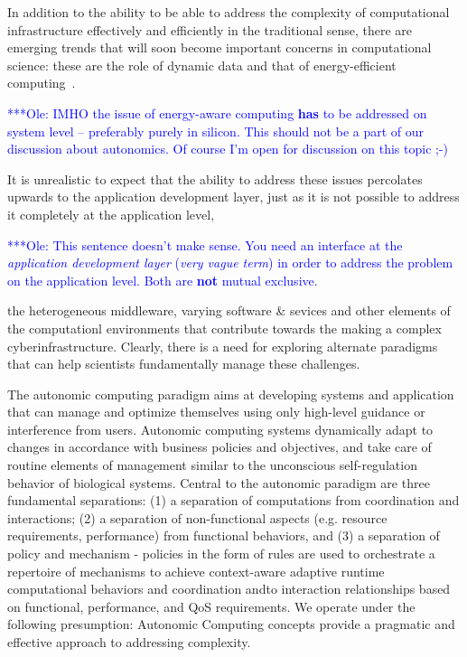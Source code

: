 \documentclass[a4paper,10pt]{article}
\newcommand{\onote}[1]{  {\textcolor{blue}     { ***Ole: #1 }}}
\begin{document}
In addition to the ability to be able to address the complexity of
computational infrastructure effectively and efficiently in the
traditional sense, there are emerging trends that will soon become
important concerns in computational science: these are the role of
dynamic data and that of energy-efficient
computing~\cite{exa-kogge09}. 

\onote {IMHO the issue of energy-aware computing \textbf{has} to 
be addressed on system level -- preferably purely in silicon.
This should not be a part of our discussion about autonomics.
Of course I'm open for discussion on this topic ;-)}

It is unrealistic to expect that the
ability to address these issues percolates upwards to the application
development layer, just as it is not possible to address it completely at
the application level, 

\onote {This sentence doesn't make sense. You need an interface at the
\textit{application development layer} (\textit{very vague term})
in order to address the problem on the application level. Both are 
\textbf{not} mutual exclusive. }

the heterogeneous middleware, varying software
\& sevices and other elements of the computationl environments that
contribute towards the making a complex cyberinfrastructure.  Clearly,
there is a need for exploring alternate paradigms that can help
scientists fundamentally manage these challenges.

The autonomic computing paradigm aims at developing systems and
application that can manage and optimize themselves using only
high-level guidance or interference from users. Autonomic computing
systems dynamically adapt to changes in accordance with business
policies and objectives, and take care of routine elements of
management similar to the unconscious self-regulation behavior of
biological systems. Central to the autonomic paradigm are three
fundamental separations: (1) a separation of computations from
coordination and interactions; (2) a separation of non-functional
aspects (e.g. resource requirements, performance) from functional
behaviors, and (3) a separation of policy and mechanism - policies in
the form of rules are used to orchestrate a repertoire of mechanisms
to achieve context-aware adaptive runtime computational behaviors and
coordination andto interaction relationships based on functional,
performance, and QoS requirements. We operate under the following
presumption: Autonomic Computing concepts provide a pragmatic and
effective approach to addressing complexity.
\end{document}
